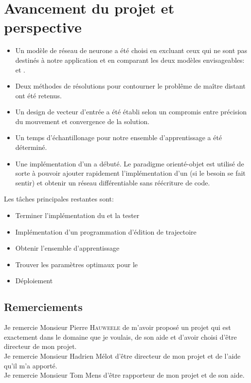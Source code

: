 \documentclass[12pt,a4paper,oneside, titlepage]{article}
\begin{document}
\section{Avancement du projet et perspective}
\begin{itemize}
 \item Un modèle de réseau de neurone a été choisi en excluant ceux qui ne sont pas destinés à notre application et en comparant les deux modèles envisageables: \mlp et \rbf.
 \item Deux méthodes de résolutions pour contourner le problême de maître distant ont été retenus.
 \item Un design de vecteur d'entrée a été établi selon un compromis entre précision du mouvement et convergence de la solution.
 \item Un temps d'échantillonage pour notre ensemble d'apprentissage a été déterminé.
 \item Une implémentation d'un \rbf a débuté. Le paradigme orienté-objet est utilisé de sorte à pouvoir ajouter rapidement l'implémentation d'un \mlp (si le besoin se fait sentir) et obtenir un réseau différentiable sans réécriture de code.
\end{itemize}
Les tâches principales restantes sont:
\begin{itemize}
 \item Terminer l'implémentation du \rbf et la tester
 \item Implémentation d'un programmation d'édition de trajectoire
 \item Obtenir l'ensemble d'apprentissage
 \item Trouver les paramètres optimaux pour le \rbf
 \item Déploiement
\end{itemize}


\subsection*{Remerciements}
\noindent Je remercie Monsieur Pierre \textsc{Hauweele} de m'avoir proposé un projet qui est exactement dans le domaine que je voulais, de son aide et d'avoir choisi d'être directeur de mon projet.\\

\noindent Je remercie Monsieur Hadrien Mélot d'être directeur de mon projet et de l'aide qu'il m'a apporté.\\

\noindent Je remercie Monsieur Tom Mens d'être rapporteur de mon projet et de son aide.\\
\end{document}
